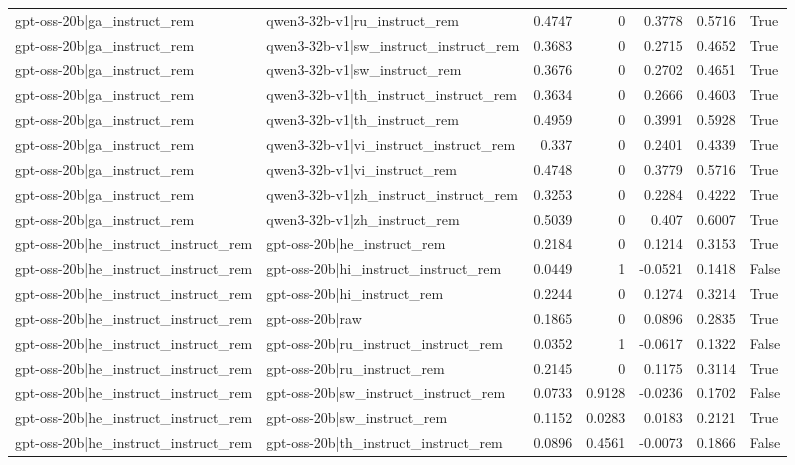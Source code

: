 \begin{table}
\begin{tabular}{l l r r r r l}
gpt-oss-20b|ga_instruct_rem & qwen3-32b-v1|ru_instruct_rem & 0.4747 & 0 & 0.3778 & 0.5716 & True \\
gpt-oss-20b|ga_instruct_rem & qwen3-32b-v1|sw_instruct_instruct_rem & 0.3683 & 0 & 0.2715 & 0.4652 & True \\
gpt-oss-20b|ga_instruct_rem & qwen3-32b-v1|sw_instruct_rem & 0.3676 & 0 & 0.2702 & 0.4651 & True \\
gpt-oss-20b|ga_instruct_rem & qwen3-32b-v1|th_instruct_instruct_rem & 0.3634 & 0 & 0.2666 & 0.4603 & True \\
gpt-oss-20b|ga_instruct_rem & qwen3-32b-v1|th_instruct_rem & 0.4959 & 0 & 0.3991 & 0.5928 & True \\
gpt-oss-20b|ga_instruct_rem & qwen3-32b-v1|vi_instruct_instruct_rem & 0.337 & 0 & 0.2401 & 0.4339 & True \\
gpt-oss-20b|ga_instruct_rem & qwen3-32b-v1|vi_instruct_rem & 0.4748 & 0 & 0.3779 & 0.5716 & True \\
gpt-oss-20b|ga_instruct_rem & qwen3-32b-v1|zh_instruct_instruct_rem & 0.3253 & 0 & 0.2284 & 0.4222 & True \\
gpt-oss-20b|ga_instruct_rem & qwen3-32b-v1|zh_instruct_rem & 0.5039 & 0 & 0.407 & 0.6007 & True \\
gpt-oss-20b|he_instruct_instruct_rem & gpt-oss-20b|he_instruct_rem & 0.2184 & 0 & 0.1214 & 0.3153 & True \\
gpt-oss-20b|he_instruct_instruct_rem & gpt-oss-20b|hi_instruct_instruct_rem & 0.0449 & 1 & -0.0521 & 0.1418 & False \\
gpt-oss-20b|he_instruct_instruct_rem & gpt-oss-20b|hi_instruct_rem & 0.2244 & 0 & 0.1274 & 0.3214 & True \\
gpt-oss-20b|he_instruct_instruct_rem & gpt-oss-20b|raw & 0.1865 & 0 & 0.0896 & 0.2835 & True \\
gpt-oss-20b|he_instruct_instruct_rem & gpt-oss-20b|ru_instruct_instruct_rem & 0.0352 & 1 & -0.0617 & 0.1322 & False \\
gpt-oss-20b|he_instruct_instruct_rem & gpt-oss-20b|ru_instruct_rem & 0.2145 & 0 & 0.1175 & 0.3114 & True \\
gpt-oss-20b|he_instruct_instruct_rem & gpt-oss-20b|sw_instruct_instruct_rem & 0.0733 & 0.9128 & -0.0236 & 0.1702 & False \\
gpt-oss-20b|he_instruct_instruct_rem & gpt-oss-20b|sw_instruct_rem & 0.1152 & 0.0283 & 0.0183 & 0.2121 & True \\
gpt-oss-20b|he_instruct_instruct_rem & gpt-oss-20b|th_instruct_instruct_rem & 0.0896 & 0.4561 & -0.0073 & 0.1866 & False \\

\end{tabular}
\end{table}
